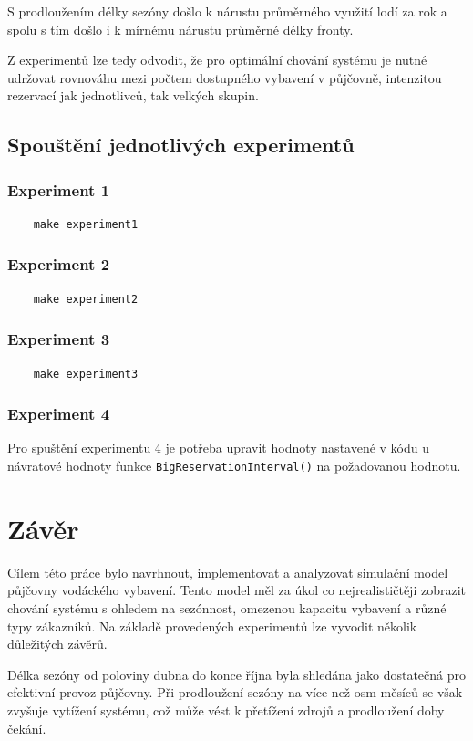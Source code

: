 \documentclass[a4paper, 12pt, hidelinks]{article}
\begin{document}
S prodloužením délky sezóny došlo k nárustu průměrného využití lodí za rok a spolu s tím došlo i k mírnému nárustu průměrné délky fronty.

Z experimentů lze tedy odvodit, že pro optimální chování systému je nutné udržovat rovnováhu mezi počtem dostupného vybavení v půjčovně, intenzitou rezervací jak jednotlivců, tak velkých skupin.

\subsection{Spouštění jednotlivých experimentů}
\subsubsection{Experiment 1}
\begin{verbatim}
    make experiment1
\end{verbatim}
\subsubsection{Experiment 2}
\begin{verbatim}
    make experiment2
\end{verbatim}
\subsubsection{Experiment 3}
\begin{verbatim}
    make experiment3
\end{verbatim}
\subsubsection{Experiment 4}
Pro spuštění experimentu 4 je potřeba upravit hodnoty nastavené v kódu u návratové hodnoty funkce \texttt{BigReservationInterval()} na požadovanou hodnotu.
\newpage
\section{Závěr}
Cílem této práce bylo navrhnout, implementovat a analyzovat simulační model půjčovny vodáckého vybavení. Tento model měl za úkol co nejrealističtěji zobrazit chování systému s ohledem na sezónnost, omezenou kapacitu vybavení a různé typy zákazníků. Na základě provedených experimentů lze vyvodit několik důležitých závěrů.

Délka sezóny od poloviny dubna do konce října byla shledána jako dostatečná pro efektivní provoz půjčovny. Při prodloužení sezóny na více než osm měsíců se však zvyšuje vytížení systému, což může vést k přetížení zdrojů a prodloužení doby čekání.
\end{document}
